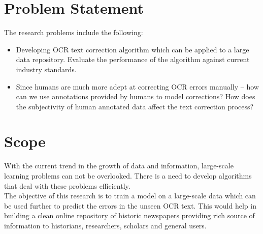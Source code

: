 \documentclass{article}
\begin{document}

\section{Problem Statement}
The research problems include the following:
\begin{itemize}
\item Developing OCR text correction algorithm which can be applied to a large data repository. Evaluate the performance of the algorithm against current industry standards.
\item Since humans are much more adept at correcting OCR errors manually -- how can we use annotations provided by humans to model corrections? How does the subjectivity of human annotated data affect the text correction process?
\end{itemize} 

 
\section{Scope}
With the current trend in the growth of data and information, large-scale learning problems can not be overlooked. There is a need to develop algorithms that deal with these problems efficiently.\\
The objective of this research is to train a model on a large-scale data which can be used further to predict the errors in the unseen OCR text.
This would help in building a clean online repository of historic newspapers providing rich source of information to historians, researchers, scholars and general users.

\nocite{winnow,wikiedits,carlson1999snow,menon2009large,Joachims:1999:MLS:299094.299104,ibm,structuredML}


\end{document}
